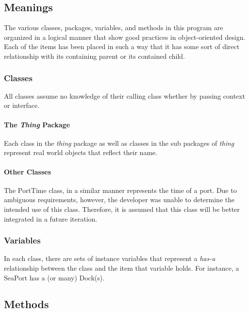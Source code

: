 \documentclass[english,floatsintext,man]{apa6}
\begin{document}
\begin{itemize}
  \subsection{Meanings}\label{meanings}

  The various classes, packages, variables, and methods in this program
  are organized in a logical manner that show good practices in
  object-oriented design. Each of the items has been placed in such a
  way that it has some sort of direct relationship with its containing
  parent or its contained child.
\end{itemize}

\subsubsection{Classes}\label{classes}

All classes assume no knowledge of their calling class whether by
passing context or interface.

\paragraph{\texorpdfstring{The \emph{Thing}
Package}{The Thing Package}}\label{the-thing-package}

Each class in the \emph{thing} package as well as classes in the sub
packages of \emph{thing} represent real world objects that reflect their
name.

\paragraph{Other Classes}\label{other-classes}

The PortTime class, in a similar manner represents the time of a port.
Due to ambiguous requirements, however, the developer was unable to
determine the intended use of this class. Therefore, it is assumed that
this class will be better integrated in a future iteration.

\subsubsection{Variables}\label{variables}

In each class, there are sets of instance variables that represent a
\emph{has-a} relationship between the class and the item that variable
holds. For instance, a SeaPort has a (or many) Dock(s).

\subsection{Methods}\label{methods}
\end{document}

